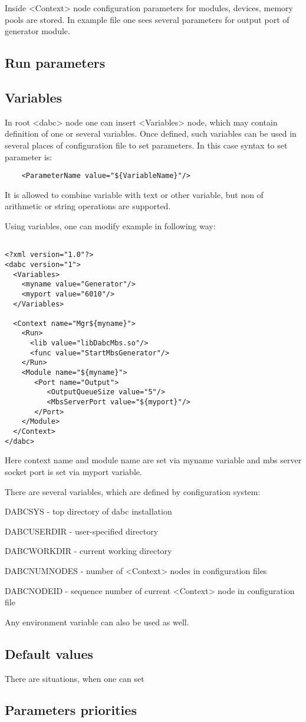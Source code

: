 Inside <Context> node configuration parameters for modules, devices, memory pools are stored.
In example file one sees several parameters for output port of generator module.  

\subsection{Run parameters}


\subsection{Variables}

In root <dabc> node one can insert <Variables> node, which may contain 
definition of one or several variables. Once defined, 
such variables can be used in several places of configuration file to set parameters.
In this case syntax to set parameter is:

\begin{verbatim}
    <ParameterName value="${VariableName}"/>
\end{verbatim}

It is allowed to combine variable with text or other variable, 
but non of arithmetic or string operations are supported. 

Using variables, one can modify example in following way:

\begin{verbatim}

<?xml version="1.0"?>
<dabc version="1">
  <Variables>
    <myname value="Generator"/> 
    <myport value="6010"/> 
  </Variables>

  <Context name="Mgr${myname}">
    <Run>
      <lib value="libDabcMbs.so"/>
      <func value="StartMbsGenerator"/>
    </Run>
    <Module name="${myname}">
       <Port name="Output">
          <OutputQueueSize value="5"/>
          <MbsServerPort value="${myport}"/>
       </Port>
    </Module>
  </Context>
</dabc>

\end{verbatim}

Here context name and module name are set via myname variable and mbs server 
socket port is set via myport variable.

There are several variables, which are defined by configuration system:

\bbul
\item DABCSYS - top directory of dabc installation
\item DABCUSERDIR - user-specified directory
\item DABCWORKDIR - current working directory
\item DABCNUMNODES - number of <Context> nodes in configuration files
\item DABCNODEID - sequence number of current <Context> node in configuration file 
\ebul

Any environment variable can also be used as well. 

\subsection{Default values}

There are situations, when one can set 


\subsection{Parameters priorities}

 